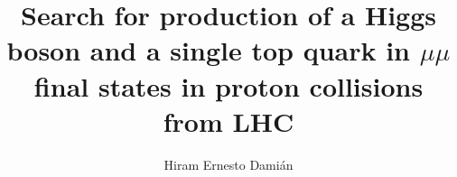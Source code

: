 \title{Search for production of a Higgs boson and a single top quark in \texorpdfstring{$\mu\mu$ final}{final} states in proton collisions from LHC}


\author{Hiram Ernesto Dami\'an}








     
